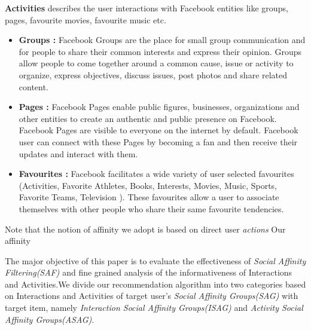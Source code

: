 {\bf Activities} describes the user interactions with Facebook entities like groups, pages, favourite movies, favourite music etc.
\begin{itemize}
  \item \textbf{Groups :} Facebook Groups are the place for small group communication and for people to share their common interests 
  						and express their opinion. Groups allow people to come together around a common cause, issue or activity to
  						organize, express objectives, discuss issues, post photos and share related content.
  \item \textbf{Pages :}  Facebook Pages enable public figures, businesses, organizations and other entities to create an authentic 
  						and public presence on Facebook. Facebook Pages are visible to everyone on the internet 
  						by default. Facebook user can connect with these Pages by becoming a fan and then receive their updates and interact with them.
  \item \textbf{Favourites :} Facebook facilitates a wide variety of user selected favourites (Activities, Favorite Athletes, Books, 
  							Interests, Movies, Music, Sports, Favorite Teams, Television ). These favourites allow a user to associate themselves with other people who share their same favourite tendencies.
\end{itemize} 

Note that the notion of affinity we adopt is based on direct user {\em actions}
Our affinity
\cite{Panigrahy2012ubr}
\cite{Goel2012structure}
\cite{Wilson2012BSG}



The major objective of this paper is to evaluate the effectiveness of \textit{Social Affinity Filtering(SAF)} and fine grained 
analysis of the informativeness of Interactions and Activities.We divide our recommendation algorithm into two categories based 
on Interactions and Activities of target user's \textit{ Social Affinity Groups(SAG)} with target item, 
namely \textit{Interaction  Social Affinity Groups(ISAG)} and \textit{Activity Social Affinity Groups(ASAG)}.

